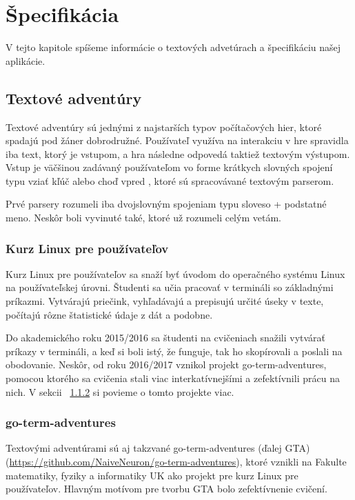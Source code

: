 \chapter{Špecifikácia}
\label{kap:specifikacia}

V tejto kapitole spíšeme informácie o textových advetúrach a špecifikáciu
našej aplikácie.

\section{Textové adventúry}
\label{sec:textadventures}

Textové adventúry sú jednými z najstarších typov počítačových hier, ktoré spadajú
pod žáner dobrodružné. Používateľ využíva na interakciu v hre spravidla iba text,
ktorý je vstupom, a hra následne odpovedá taktiež textovým výstupom.
Vstup je väčšinou zadávaný používateľom vo forme krátkych slovných spojení
typu \glqq vziať kľúč \grqq alebo \glqq choď vpred \grqq, ktoré sú spracovávané
textovým parserom.

Prvé parsery rozumeli iba dvojslovným spojeniam typu sloveso + podstatné meno. Neskôr
boli vyvinuté také, ktoré už rozumeli celým vetám.~\cite{bib:adventures}

\subsection{Kurz Linux pre používateľov}
\label{sec:textadventures:linuxforusers}

Kurz Linux pre používateľov sa snaží byť úvodom do operačného systému Linux
na používateľskej úrovni. Študenti sa učia pracovať v termináli so základnými
príkazmi. Vytvárajú priečink, vyhľadávajú a prepisujú určité úseky v texte,
počítajú rôzne štatistické údaje z dát a podobne.

Do akademického roku 2015/2016 sa študenti na cvičeniach snažili vytvárať príkazy v
termináli, a keď si boli istý, že funguje, tak ho skopírovali a poslali na obodovanie.
Neskôr, od roku 2016/2017 vznikol projekt go-term-adventures, pomocou ktorého sa
cvičenia stali viac interkatívnejšími a zefektívnili prácu na nich. V sekcii
~\ref{sec:textadventures:gta} si povieme o tomto projekte viac.

\subsection{go-term-adventures}
\label{sec:textadventures:gta}

Textovými adventúrami sú aj takzvané go-term-adventures (ďalej GTA) (\url{https://github.com/NaiveNeuron/go-term-adventures}), ktoré vznikli
na Fakulte matematiky, fyziky a informatiky UK ako projekt pre kurz Linux pre
používateľov. Hlavným motívom pre tvorbu GTA bolo zefektívnenie cvičení.

